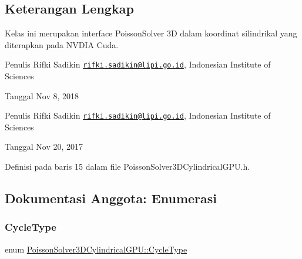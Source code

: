 \subsection{Keterangan Lengkap}
Kelas ini merupakan interface Poisson\+Solver 3D dalam koordinat silindrikal yang diterapkan pada N\+V\+D\+IA Cuda. 

\begin{DoxyAuthor}{Penulis}
Rifki Sadikin \href{mailto:rifki.sadikin@lipi.go.id}{\tt rifki.\+sadikin@lipi.\+go.\+id}, Indonesian Institute of Sciences 
\end{DoxyAuthor}
\begin{DoxyDate}{Tanggal}
Nov 8, 2018
\end{DoxyDate}
\begin{DoxyAuthor}{Penulis}
Rifki Sadikin \href{mailto:rifki.sadikin@lipi.go.id}{\tt rifki.\+sadikin@lipi.\+go.\+id}, Indonesian Institute of Sciences 
\end{DoxyAuthor}
\begin{DoxyDate}{Tanggal}
Nov 20, 2017 
\end{DoxyDate}


Definisi pada baris 15 dalam file Poisson\+Solver3\+D\+Cylindrical\+G\+P\+U.\+h.



\subsection{Dokumentasi Anggota\+: Enumerasi}
\hypertarget{classPoissonSolver3DCylindricalGPU_adb48f4d0173159081f19f859bb3c0ffc}{}\label{classPoissonSolver3DCylindricalGPU_adb48f4d0173159081f19f859bb3c0ffc} 
\subsubsection{\texorpdfstring{Cycle\+Type}{CycleType}}
{\footnotesize\ttfamily enum \hyperlink{classPoissonSolver3DCylindricalGPU_adb48f4d0173159081f19f859bb3c0ffc}{Poisson\+Solver3\+D\+Cylindrical\+G\+P\+U\+::\+Cycle\+Type}}

